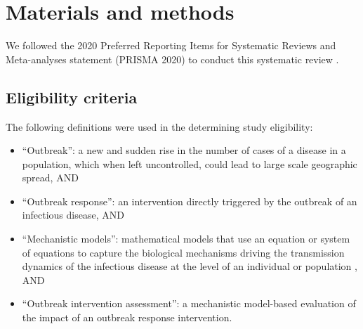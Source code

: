 \documentclass[10pt,letterpaper]{article}
\begin{document}
   

\section*{Materials and methods}
We followed the 2020 Preferred Reporting Items for Systematic Reviews and Meta-analyses statement (PRISMA 2020)  to conduct this systematic review \cite{Page2021}.

\subsection*{Eligibility criteria}
The following definitions were used in the determining study eligibility:

\begin{itemize}
	\item ``Outbreak'': a new and sudden rise in the number of cases of a disease in a population, which when left uncontrolled, could lead to large scale geographic spread, AND 
	\item ``Outbreak response'': an intervention directly triggered by the outbreak of an infectious disease, AND
	\item ``Mechanistic models'': mathematical models that use an equation or system of equations to capture the biological mechanisms driving the transmission dynamics of the infectious disease at the level of an individual or population \cite{Lessler2016a,Reiner2013}, AND
	\item ``Outbreak intervention assessment'': a mechanistic model-based evaluation of the impact of an outbreak response intervention.
\end{itemize}
\end{document}
